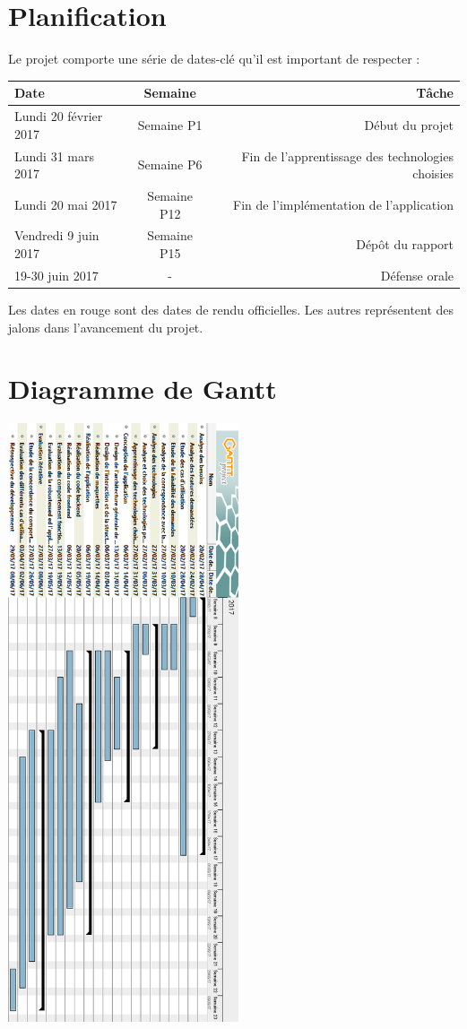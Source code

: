 \section{Planification}
Le projet comporte une série de dates-clé qu’il est important de respecter :
\begin{center}
   \begin{tabular}{ | l | c | r | }
     \hline
		Date & Semaine & Tâche \\ \hline
		\color{red}Lundi 20 février 2017 & Semaine P1 & Début du projet \\ \hline
		Lundi 31 mars 2017 & Semaine P6 & Fin de l’apprentissage des technologies choisies \\ \hline
		Lundi 20 mai 2017 & Semaine P12 & Fin de l’implémentation de l’application \\ \hline
		\color{red}Vendredi 9 juin 2017 & Semaine P15 & Dépôt du rapport \\ \hline
		\color{red}19-30 juin 2017 & - & Défense orale \\ \hline
     \hline
   \end{tabular}
\end{center}

Les dates en rouge sont des dates de rendu officielles.
Les autres représentent des jalons dans l’avancement du projet.

\section{Diagramme de Gantt}
	\includegraphics[width=0.51\textwidth]{images/annexes/cdc/gantt}